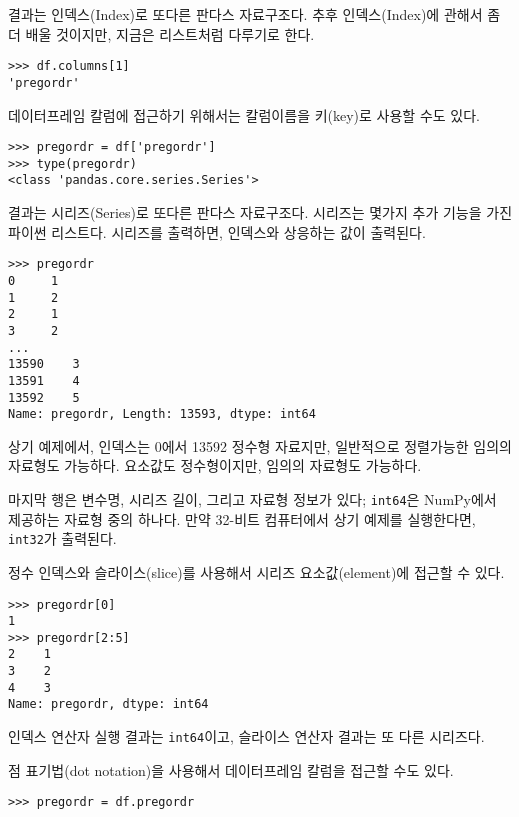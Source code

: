 결과는 인덱스(Index)로 또다른 판다스 자료구조다. 추후 인덱스(Index)에 관해서 좀더 배울 것이지만, 지금은 리스트처럼 다루기로 한다.


\begin{verbatim}
>>> df.columns[1]
'pregordr'
\end{verbatim}

데이터프레임 칼럼에 접근하기 위해서는 칼럼이름을 키(key)로 사용할 수도 있다.


\begin{verbatim}
>>> pregordr = df['pregordr']
>>> type(pregordr)
<class 'pandas.core.series.Series'>
\end{verbatim}

결과는 시리즈(Series)로 또다른 판다스 자료구조다. 시리즈는 몇가지 추가 기능을 가진 파이썬 리스트다. 시리즈를 출력하면, 인덱스와 상응하는 값이 출력된다. 


\begin{verbatim}
>>> pregordr
0     1
1     2
2     1
3     2
...
13590    3
13591    4
13592    5
Name: pregordr, Length: 13593, dtype: int64
\end{verbatim}

상기 예제에서, 인덱스는 0에서 13592 정수형 자료지만, 일반적으로 정렬가능한 임의의 자료형도 가능하다. 요소값도 정수형이지만, 임의의 자료형도 가능하다.

마지막 행은 변수명, 시리즈 길이, 그리고 자료형 정보가 있다; {\tt int64}은 NumPy에서 제공하는 자료형 중의 하나다. 만약 32-비트 컴퓨터에서 상기 예제를 실행한다면, {\tt int32}가 출력된다.

정수 인덱스와 슬라이스(slice)를 사용해서 시리즈 요소값(element)에 접근할 수 있다.

\begin{verbatim}
>>> pregordr[0]
1
>>> pregordr[2:5]
2    1
3    2
4    3
Name: pregordr, dtype: int64
\end{verbatim}

인덱스 연산자 실행 결과는 {\tt int64}이고, 슬라이스 연산자 결과는 또 다른 시리즈다. 

점 표기법(dot notation)을 사용해서 데이터프레임 칼럼을 접근할 수도 있다.


\begin{verbatim}
>>> pregordr = df.pregordr
\end{verbatim}

